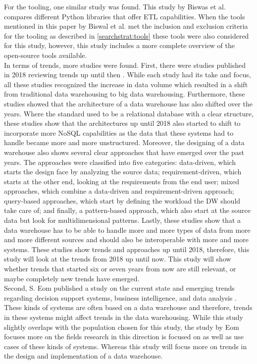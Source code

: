 \documentclass[11pt]{article}
\begin{document}
For the tooling, one similar study was found. This study by Biswas et al.\cite{Biswas_programming2019267} compares different Python libraries that offer ETL capabilities. When the tools mentioned in this paper by Biswal et al. met the inclusion and exclusion criteria for the tooling as described in \ref{searchstrat:tools} these tools were also considered for this study, however, this study includes a more complete overview of the open-source tools available.\\

In terms of trends, more studies were found. First, there were studies published in 2018 reviewing trends up until then \cite{costa2018evaluating, kozmina2018information, golfarelli2017star, chandra2018comprehensive}. While each study had its take and focus, all these studies recognized the increase in data volume which resulted in a shift from traditional data warehousing to big data warehousing. Furthermore, these studies showed that the architecture of a data warehouse has also shifted over the years. Where the standard used to be a relational database with a clear structure, these studies show that the architectures up until 2018 also started to shift to incorporate more NoSQL capabilities as the data that these systems had to handle became more and more unstructured. Moreover, the designing of a data warehouse also shows several clear approaches that have emerged over the past years. The approaches were classified into five categories: data-driven, which starts the design face by analyzing the source data; requirement-driven, which starts at the other end, looking at the requirements from the end user; mixed approaches, which combine a data-driven and requirement-driven approach; query-based approaches, which start by defining the workload the DW should take care of; and finally, a pattern-based approach, which also start at the source data but look for multidimensional patterns. Lastly, these studies show that a data warehouse has to be able to handle more and more types of data from more and more different sources and should also be interoperable with more and more systems. These studies show trends and approaches up until 2018, therefore, this study will look at the trends from 2018 up until now. This study will show whether trends that started six or seven years from now are still relevant, or maybe completely new trends have emerged.\\

Second, S. Eom published a study on the current state and emerging trends regarding decision support systems, business intelligence, and data analysis \cite{eom2020dss}. These kinds of systems are often based on a data warehouse and therefore, trends in these systems might affect trends in the data warehousing. While this study slightly overlaps with the population chosen for this study, the study by Eom focuses more on the fields research in this direction is focused on as well as use cases of these kinds of systems. Whereas this study will focus more on trends in the design and implementation of a data warehouse. \\
\end{document}
